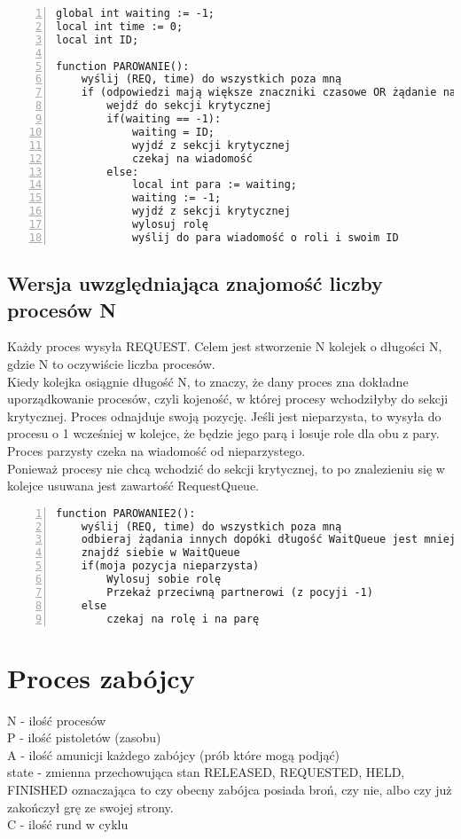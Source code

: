 \documentclass[11pt]{article}
\begin{document}
\begin{Verbatim}[numbers=left,xleftmargin=5mm]
global int waiting := -1;
local int time := 0;
local int ID;

function PAROWANIE():
    wyślij (REQ, time) do wszystkich poza mną
    if (odpowiedzi mają większe znaczniki czasowe OR żądanie na początku kolejki)
        wejdź do sekcji krytycznej
        if(waiting == -1):
            waiting = ID;
            wyjdź z sekcji krytycznej
            czekaj na wiadomość
        else:
            local int para := waiting;
            waiting := -1;
            wyjdź z sekcji krytycznej
            wylosuj rolę
            wyślij do para wiadomość o roli i swoim ID
\end{Verbatim}
\newpage

\subsection{Wersja uwzględniająca znajomość liczby procesów N}

Każdy proces wysyła REQUEST. Celem jest stworzenie N kolejek o długości N, gdzie N to oczywiście liczba procesów. \\
Kiedy kolejka osiągnie długość N, to znaczy, że dany proces zna dokładne uporządkowanie procesów, czyli kojeność, w której procesy wchodziłyby do sekcji krytycznej. Proces odnajduje swoją pozycję. Jeśli jest nieparzysta, to wysyła do procesu o 1 wcześniej w kolejce, że będzie jego parą i losuje role dla obu z pary. Proces parzysty czeka na wiadomość od nieparzystego. \\
Ponieważ procesy nie chcą wchodzić do sekcji krytycznej, to po znalezieniu się w kolejce usuwana jest zawartość RequestQueue.

\begin{Verbatim}[numbers=left,xleftmargin=5mm]
function PAROWANIE2():
    wyślij (REQ, time) do wszystkich poza mną
    odbieraj żądania innych dopóki długość WaitQueue jest mniejsza od N
    znajdź siebie w WaitQueue
    if(moja pozycja nieparzysta)
        Wylosuj sobie rolę
        Przekaż przeciwną partnerowi (z pocyji -1)
    else
        czekaj na rolę i na parę
\end{Verbatim}

\newpage
\section{Proces zabójcy}

N - ilość procesów \\
P - ilość pistoletów (zasobu) \\
A - ilość amunicji każdego zabójcy (prób które mogą podjąć) \\
state - zmienna przechowująca stan {RELEASED, REQUESTED, HELD, FINISHED} oznaczająca to czy obecny zabójca posiada broń, czy nie, albo czy już zakończył grę ze swojej strony. \\
C - ilość rund w cyklu \\
\end{document}
